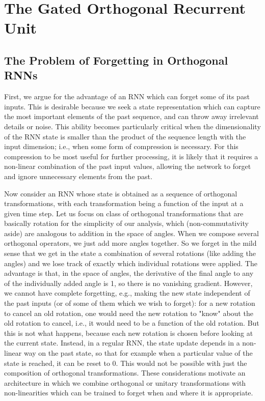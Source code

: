 \documentclass[letterpaper]{article} \usepackage{aaai18}  \usepackage{times}  \usepackage{helvet}  \usepackage{courier}  \usepackage{url}  \usepackage{graphicx}
\begin{document}
\section{The Gated Orthogonal Recurrent Unit}

\subsection{The Problem of Forgetting in Orthogonal RNNs}


First, we argue for the advantage of an RNN which can forget some of its past inputs. This is desirable because we seek a state representation which can capture the most important elements of the past sequence, and can throw away irrelevant details or noise. This ability becomes particularly critical when the dimensionality of the RNN state is smaller than the product of the sequence length with the input dimension; i.e., when some form of compression is necessary. For this compression to be most useful for further processing, it is likely that it requires a non-linear combination of the past input values, allowing the network to forget and ignore unnecessary elements from the past.

Now consider an RNN whose state is obtained as a sequence of orthogonal transformations, with each transformation being a function of the input at a given time step. Let us focus on class of orthogonal transformations that are basically rotation for the simplicity of our analysis, which (non-commutativity aside) are analogous to addition in the space of angles. When we compose several orthogonal operators, we just add more angles together. So we forget in the mild sense that we get in the state a combination of several rotations (like adding the angles) and we lose track of exactly which individual rotations were applied. The advantage is that, in the space of angles, the derivative of the final angle to any of the individually added angle is 1, so there is no vanishing gradient. However, we cannot have complete forgetting, e.g., making the new state independent of the past inputs (or of some of them which we wish to forget): for a new rotation to cancel an old rotation, one would need the new rotation to "know" about the old rotation to cancel, i.e., it would need to be a function of the old rotation. But this is not what happens, because each new rotation is chosen before looking at the current state. Instead, in a regular RNN, the state update depends in a non-linear way on the past state, so that for example when a particular value of the state is reached, it can be reset to 0. This would not be possible with just the composition of orthogonal transformations. These considerations motivate an architecture in which we combine orthogonal or unitary transformations with non-linearities which can be trained to forget when and where it is appropriate.
\end{document}
